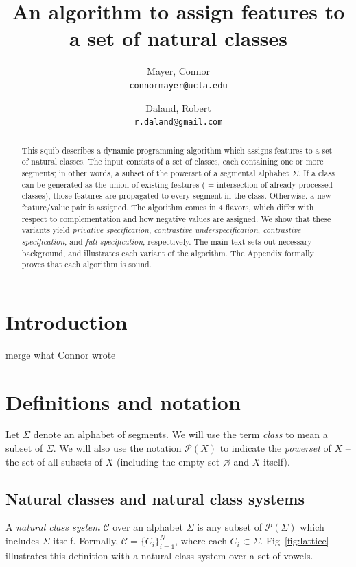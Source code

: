 \documentclass[11pt, oneside]{article}   	%
\title{An algorithm to assign features to a set of natural classes}
\author{}
\author{
  Mayer, Connor \\
  \texttt{connormayer@ucla.edu}
  \and
  Daland, Robert \\
  \texttt{r.daland@gmail.com}
}
\begin{document}
\maketitle

\begin{abstract}
This squib describes a dynamic programming algorithm which assigns features to a set of natural classes. The input consists of a set of classes, each containing one or more segments; in other words, a subset of the powerset of a segmental alphabet $\Sigma$. If a class can be generated as the union of existing features ( = intersection of already-processed classes), those features are propagated to every segment in the class. Otherwise, a new feature/value pair is assigned. The algorithm comes in 4 flavors, which differ with respect to complementation and how negative values are assigned. We show that these variants yield \textit{privative specification}, \textit{contrastive underspecification}, \textit{contrastive specification}, and \textit{full specification}, respectively. The main text sets out necessary background, and illustrates each variant of the algorithm. The Appendix formally proves that each algorithm is sound.
\end{abstract}

\section{Introduction}
merge what Connor wrote

\section{Definitions and notation}

Let $\Sigma$ denote an alphabet of segments. We will use the term \textit{class} to mean a subset of $\Sigma$. We will also use the notation $\mathcal P(X)$ to indicate the \textit{powerset} of $X$ -- the set of all subsets of $X$ (including the empty set $\varnothing$ and $X$ itself).

\subsection{Natural classes and natural class systems}

A \textit{natural class system} $\mathcal C$ over an alphabet $\Sigma$ is any subset of $\mathcal P(\Sigma)$ which includes $\Sigma$ itself. Formally, $\mathcal C = \{ C_i \}_{i=1}^N$, where each $C_i \subset \Sigma$. Fig~\ref{fig:lattice} illustrates this definition with a natural class system over a set of vowels.
\end{document}
